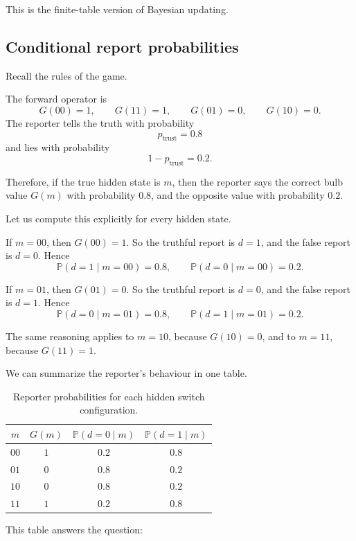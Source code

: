 \documentclass[11pt]{article}
\newcommand{\ptrust}{p_{\mathrm{trust}}}
\begin{document}
This is the finite-table version of Bayesian updating.

\subsection{Conditional report probabilities}

Recall the rules of the game.

The forward operator is
\[
    G(00)=1,
    \qquad
    G(11)=1,
    \qquad
    G(01)=0,
    \qquad
    G(10)=0.
\]
The reporter tells the truth with probability
\[
    \ptrust=0.8
\]
and lies with probability
\[
    1-\ptrust=0.2.
\]

Therefore, if the true hidden state is \(m\), then the reporter says the correct bulb value \(G(m)\) with probability \(0.8\), and the opposite value with probability \(0.2\).

Let us compute this explicitly for every hidden state.

If \(m=00\), then \(G(00)=1\). So the truthful report is \(d=1\), and the false report is \(d=0\). Hence
\[
    \mathbb{P}(d=1\mid m=00)=0.8,
    \qquad
    \mathbb{P}(d=0\mid m=00)=0.2.
\]

If \(m=01\), then \(G(01)=0\). So the truthful report is \(d=0\), and the false report is \(d=1\). Hence
\[
    \mathbb{P}(d=0\mid m=01)=0.8,
    \qquad
    \mathbb{P}(d=1\mid m=01)=0.2.
\]

The same reasoning applies to \(m=10\), because \(G(10)=0\), and to \(m=11\), because \(G(11)=1\).

We can summarize the reporter's behaviour in one table.

\begin{table}[h]
\centering
\begin{tabular}{c c c c}
\toprule
\(m\) & \(G(m)\) & \(\mathbb{P}(d=0\mid m)\) & \(\mathbb{P}(d=1\mid m)\) \\
\midrule
\(00\) & \(1\) & \(0.2\) & \(0.8\) \\
\(01\) & \(0\) & \(0.8\) & \(0.2\) \\
\(10\) & \(0\) & \(0.8\) & \(0.2\) \\
\(11\) & \(1\) & \(0.2\) & \(0.8\) \\
\bottomrule
\end{tabular}
\caption{Reporter probabilities for each hidden switch configuration.}
\label{tab:reporter-probabilities}
\end{table}

This table answers the question:
\end{document}
